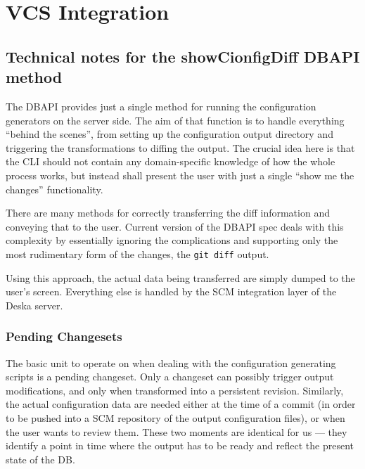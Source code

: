 \documentclass[deska]{subfiles}
\begin{document}
\section{VCS Integration}
\label{sec:cfggen-scm-integration}


\subsection{Technical notes for the showCionfigDiff DBAPI method}

The DBAPI provides just a single method for running the configuration generators on the server side.  The aim of that
function is to handle everything ``behind the scenes'', from setting up the configuration output directory and
triggering the transformations to diffing the output.  The crucial idea here is that the CLI should not contain any
domain-specific knowledge of how the whole process works, but instead shall present the user with just a single ``show
me the changes'' functionality.

There are many methods for correctly transferring the diff information and conveying that to the user.  Current version
of the DBAPI spec deals with this complexity by essentially ignoring the complications and supporting only the most
rudimentary form of the changes, the {\tt git diff} output.

Using this approach, the actual data being transferred are simply dumped to the user's screen.  Everything else is
handled by the SCM integration layer of the Deska server.

\subsubsection{Pending Changesets}

The basic unit to operate on when dealing with the configuration generating scripts is a pending changeset.  Only a
changeset can possibly trigger output modifications, and only when transformed into a persistent revision.  Similarly,
the actual configuration data are needed either at the time of a commit (in order to be pushed into a SCM repository of
the output configuration files), or when the user wants to review them.  These two moments are identical for us --- they
identify a point in time where the output has to be ready and reflect the present state of the DB.
\end{document}

